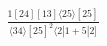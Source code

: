 \documentclass[varwidth, border=5pt]{standalone}
\begin{document}
\begin{my}
$\begin{gathered}
\scriptscriptstyle\frac{1[24][13]⟨25⟩[25]}{⟨34⟩[25]^2⟨2|1+5|2]}
\end{gathered}$
\end{my}
\end{document}
